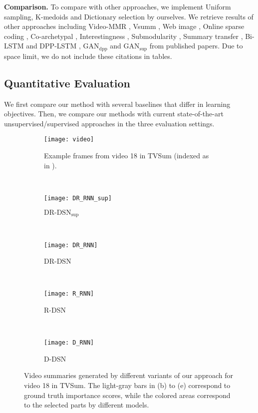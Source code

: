 \documentclass[letterpaper]{article} \usepackage{aaai18}  \usepackage{times}  \usepackage{helvet}  \usepackage{courier}  \usepackage{url}  \usepackage{graphicx}
\begin{document}
{\bf Comparison.} To compare with other approaches, we implement Uniform sampling, K-medoids and Dictionary selection \cite{elhamifar2012see} by ourselves. We retrieve results of other approaches including Video-MMR \cite{li2010multi}, Vsumm \cite{de2011vsumm}, Web image \cite{khosla2013large}, Online sparse coding \cite{zhao2014quasi}, Co-archetypal \cite{song2015tvsum}, Interestingness \cite{gygli2014creating}, Submodularity \cite{gygli2015video}, Summary transfer \cite{zhang2016summary}, Bi-LSTM and DPP-LSTM \cite{zhang2016video}, $\text{GAN}_\text{dpp}$ and $\text{GAN}_\text{sup}$ \cite{mahasseniunsupervised} from published papers. Due to space limit, we do not include these citations in tables.

\subsection{Quantitative Evaluation}
We first compare our method with several baselines that differ in learning objectives. Then, we compare our methods with current state-of-the-art unsupervised/supervised approaches in the three evaluation settings.

\begin{figure*}[t]
\centering
  \begin{subfigure}[b]{0.99\textwidth}
  \texttt{[image: video]}
  \caption{Example frames from video 18 in TVSum (indexed as in \cite{song2015tvsum}).}
  \label{fig:video18}
  \end{subfigure}
  ~
  \begin{subfigure}[b]{0.48\textwidth}
  \texttt{[image: DR\_RNN\_sup]}
  \caption{$\text{DR-DSN}_\text{sup}$}
  \label{fig:summDRRNNsup}
  \end{subfigure}
  ~
  \begin{subfigure}[b]{0.48\textwidth}
  \texttt{[image: DR\_RNN]}
  \caption{DR-DSN}
  \label{fig:summDRRNN}
  \end{subfigure}
  ~
  \begin{subfigure}[b]{0.48\textwidth}
  \texttt{[image: R\_RNN]}
  \caption{R-DSN}
  \label{fig:summRRNN}
  \end{subfigure}
  ~
  \begin{subfigure}[b]{0.48\textwidth}
  \texttt{[image: D\_RNN]}
  \caption{D-DSN}
  \label{fig:summDRNN}
  \end{subfigure}
\caption{Video summaries generated by different variants of our approach for video 18 in TVSum. The light-gray bars in (b) to (e) correspond to ground truth importance scores, while the colored areas correspond to the selected parts by different models.}
\label{fig:qualitativeresults}
\end{figure*}
\end{document}
